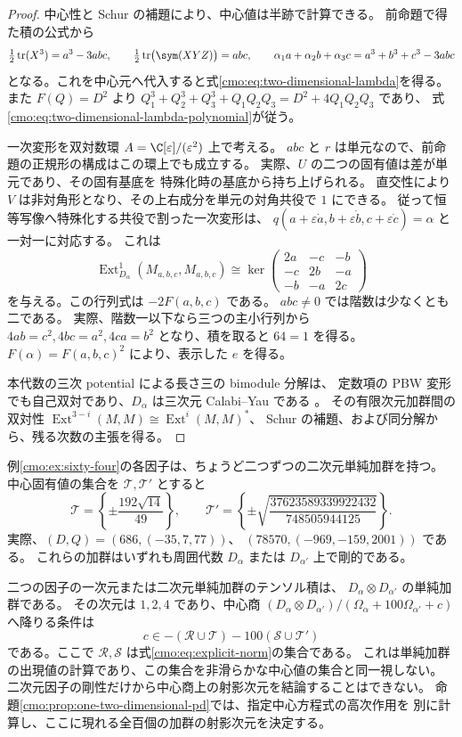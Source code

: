 \begin{proof}
中心性と Schur の補題により、中心値は半跡で計算できる。
前命題で得た積の公式から
\[
 \tfrac12\operatorname{tr}(X^3)=a^3-3abc,\qquad
 \tfrac12\operatorname{tr}\bigl(\sym(XYZ)\bigr)=abc,
 \qquad
 \alpha_1a+\alpha_2b+\alpha_3c=a^3+b^3+c^3-3abc
\]
となる。これを中心元へ代入すると式\eqref{cmo:eq:two-dimensional-lambda}を得る。
また $F(Q)=D^2$ より
$Q_1^3+Q_2^3+Q_3^3+Q_1Q_2Q_3=D^2+4Q_1Q_2Q_3$ であり、
式\eqref{cmo:eq:two-dimensional-lambda-polynomial}が従う。

一次変形を双対数環 $A=\C[\varepsilon]/(\varepsilon^2)$ 上で考える。
$abc$ と $r$ は単元なので、前命題の正規形の構成はこの環上でも成立する。
実際、$U$ の二つの固有値は差が単元であり、その固有基底を
特殊化時の基底から持ち上げられる。
直交性により $V$ は非対角形となり、その上右成分を単元の対角共役で $1$ にできる。
従って恒等写像へ特殊化する共役で割った一次変形は、
$q(a+\varepsilon\dot a,b+\varepsilon\dot b,c+\varepsilon\dot c)=\alpha$ と一対一に対応する。
これは
\[
 \operatorname{Ext}^1_{D_\alpha}(M_{a,b,c},M_{a,b,c})
 \cong\ker
 \begin{pmatrix}
 2a&-c&-b\\-c&2b&-a\\-b&-a&2c
 \end{pmatrix}
\]
を与える。この行列式は $-2F(a,b,c)$ である。
$abc\ne0$ では階数は少なくとも二である。
実際、階数一以下なら三つの主小行列から
$4ab=c^2,4bc=a^2,4ca=b^2$ となり、積を取ると $64=1$ を得る。
$F(\alpha)=F(a,b,c)^2$ により、表示した $e$ を得る。

本代数の三次 potential による長さ三の bimodule 分解は、
定数項の PBW 変形でも自己双対であり、$D_\alpha$ は三次元 Calabi--Yau である
\cite[Theorem~3.3.2]{NFMEG}。
その有限次元加群間の双対性
$\operatorname{Ext}^{3-i}(M,M)\cong\operatorname{Ext}^{i}(M,M)^*$、
Schur の補題、および同分解から、残る次数の主張を得る。
\end{proof}

\begin{example}
\label{cmo:ex:two-dimensional-sixty-four}
例\ref{cmo:ex:sixty-four}の各因子は、ちょうど二つずつの二次元単純加群を持つ。
中心固有値の集合を $\mathcal T,\mathcal T'$ とすると
\[
 \mathcal T=\left\{\pm\frac{192\sqrt{14}}{49}\right\},\qquad
 \mathcal T'=\left\{\pm\sqrt{\frac{37623589339922432}{748505944125}}\right\}.
\]
実際、$(D,Q)=(686,(-35,7,77))$、
$(78570,(-969,-159,2001))$ である。
これらの加群はいずれも周囲代数 $D_\alpha$ または $D_{\alpha'}$ 上で剛的である。

二つの因子の一次元または二次元単純加群のテンソル積は、
$D_\alpha\otimes D_{\alpha'}$ の単純加群である。
その次元は $1,2,4$ であり、中心商
$(D_\alpha\otimes D_{\alpha'})/(\Omega_\alpha+100\Omega_{\alpha'}+c)$
へ降りる条件は
\[
 c\in-(\mathcal R\cup\mathcal T)-100(\mathcal S\cup\mathcal T')
\]
である。ここで $\mathcal R,\mathcal S$ は式\eqref{cmo:eq:explicit-norm}の集合である。
これは単純加群の出現値の計算であり、この集合を非滑らかな中心値の集合と同一視しない。
二次元因子の剛性だけから中心商上の射影次元を結論することはできない。
命題\ref{cmo:prop:one-two-dimensional-pd}では、指定中心方程式の高次作用を
別に計算し、ここに現れる全百個の加群の射影次元を決定する。
\end{example}

